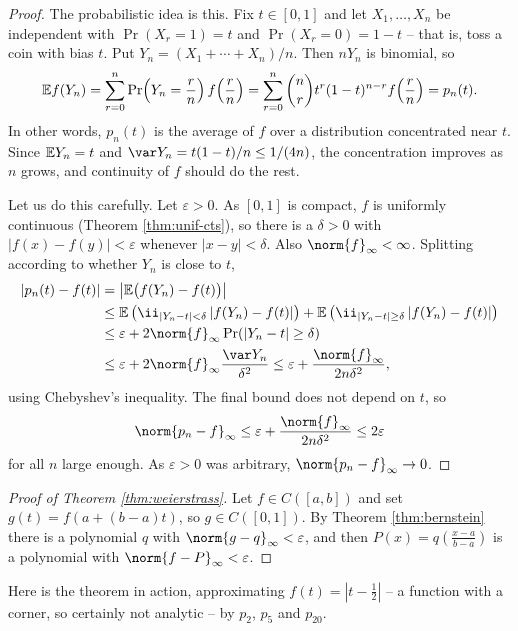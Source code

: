 \documentclass[a4paper]{scrartcl}
\begin{document}
\begin{proof}
	The probabilistic idea is this. Fix $t\in[0,1]$ and let $X_1,\ldots,X_n$ be independent with $\Pr(X_r=1)=t$ and $\Pr(X_r=0)=1-t$ -- that is, toss a coin with bias $t$. Put $Y_n = (X_1+\cdots+X_n)/n$. Then $nY_n$ is binomial, so
	$$\mathbb{E} f(Y_n) = \sum_{r=0}^n \Pr\!\left(Y_n = \frac rn\right)f\!\left(\frac rn\right) = \sum_{r=0}^n\binom nr t^r(1-t)^{n-r}f\!\left(\frac rn\right) = p_n(t).$$
	In other words, $p_n(t)$ is the average of $f$ over a distribution concentrated near $t$. Since $\mathbb{E} Y_n = t$ and $\var Y_n = t(1-t)/n \leq 1/(4n)$, the concentration improves as $n$ grows, and continuity of $f$ should do the rest.

	Let us do this carefully. Let $\varepsilon>0$. As $[0,1]$ is compact, $f$ is uniformly continuous (Theorem \ref{thm:unif-cts}), so there is a $\delta>0$ with $|f(x)-f(y)|<\varepsilon$ whenever $|x-y|<\delta$. Also $\norm{f}_\infty<\infty$. Splitting according to whether $Y_n$ is close to $t$,
	\begin{align*}
		|p_n(t)-f(t)| &= \left|\EE\big(f(Y_n)-f(t)\big)\right| \\
		&\leq \EE\left(\ii_{|Y_n-t|<\delta}\,|f(Y_n)-f(t)|\right) + \EE\left(\ii_{|Y_n-t|\geq\delta}\,|f(Y_n)-f(t)|\right)\\
		&\leq \varepsilon + 2\norm{f}_\infty\Pr(|Y_n-t|\geq\delta) \\
		&\leq \varepsilon + 2\norm{f}_\infty\frac{\var Y_n}{\delta^2} \leq \varepsilon + \frac{\norm{f}_\infty}{2n\delta^2},
	\end{align*}
	using Chebyshev's inequality. The final bound does not depend on $t$, so
	$$\norm{p_n-f}_\infty \leq \varepsilon + \frac{\norm{f}_\infty}{2n\delta^2} \leq 2\varepsilon$$
	for all $n$ large enough. As $\varepsilon>0$ was arbitrary, $\norm{p_n-f}_\infty\to0$.
\end{proof}

\begin{proof}[Proof of Theorem \ref{thm:weierstrass}]
	Let $f\in C([a,b])$ and set $g(t) = f(a + (b-a)t)$, so $g \in C([0,1])$. By Theorem \ref{thm:bernstein} there is a polynomial $q$ with $\norm{g-q}_\infty<\varepsilon$, and then $P(x) = q\left(\frac{x-a}{b-a}\right)$ is a polynomial with $\norm{f-P}_\infty<\varepsilon$.
\end{proof}

Here is the theorem in action, approximating $f(t) = |t-\tfrac12|$ -- a function with a corner, so certainly not analytic -- by $p_2$, $p_5$ and $p_{20}$.
\end{document}
